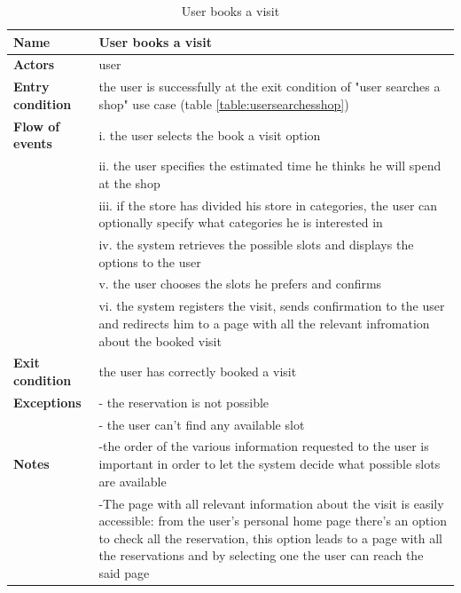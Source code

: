 \begin{table}[h!]
    \centering
    \begin{tabular}{@{}P{0.2\textwidth}P{0.70\textwidth}@{}}
        \toprule
        \textbf{Name}                 & User books a visit\\
        \midrule
        \textbf{Actors}               & user\\
        \textbf{Entry condition}      & the user is successfully at the exit condition of "user searches a shop" use case (table \ref{table:usersearchesshop})\\
        \textbf{Flow of events}            
        & i. the user selects the book a visit option\\
        & ii. the user specifies the estimated time he thinks he will spend at the shop\\
        & iii. if the store has divided his store in categories, the user can optionally specify what categories he is interested in\\
        & iv. the system retrieves the possible slots and displays the options to the user\\
        & v. the user chooses the slots he prefers and confirms\\
        & vi. the system registers the visit, sends confirmation to the user and redirects him to a page with all the relevant infromation about the booked visit\\
        \textbf{Exit condition}       & the user has correctly booked a visit\\
        \textbf{Exceptions}           
        & - the reservation is not possible\\
        & - the user can't find any available slot\\
        \textbf{Notes} 
        & -the order of the various information requested to the user is important in order to let the system decide what possible slots are available\\
        & -The page with all relevant information about the visit is easily accessible: from the user's personal home page there's an option to check all the reservation, this option leads to a page with all the reservations and by selecting one the user can reach the said page\\
        \bottomrule
    \end{tabular}
\caption{User books a visit}
\label{table:userbooksavisit}
\end{table}

